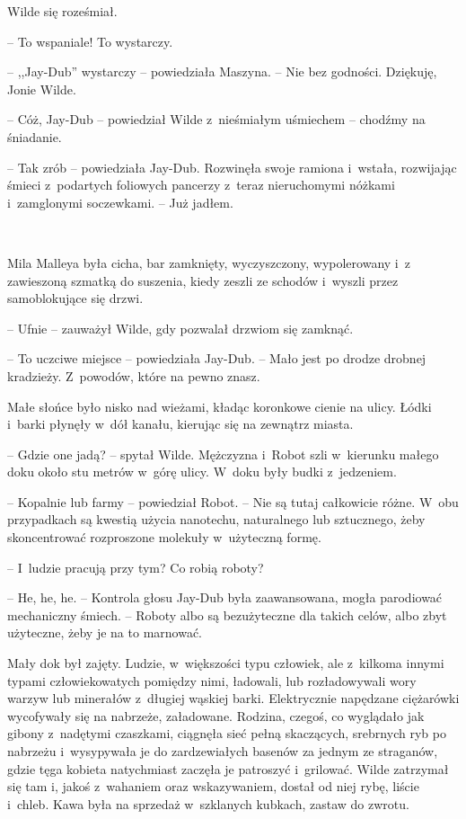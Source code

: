 \documentclass[oneside,polish,11pt,sfheadings]{mwbk}
\begin{document}
Wilde się roześmiał. 

-- To wspaniale! To wystarczy.

-- ,,Jay-Dub'' wystarczy -- powiedziała Maszyna. -- Nie bez godności.
Dziękuję, Jonie Wilde.

-- Cóż, Jay-Dub -- powiedział Wilde z~nieśmiałym uśmiechem -- chodźmy na
śniadanie.

-- Tak zrób -- powiedziała Jay-Dub. Rozwinęła swoje ramiona i~wstała,
rozwijając śmieci z~podartych foliowych pancerzy z~teraz nieruchomymi
nóżkami i~zamglonymi soczewkami. -- Już jadłem.

~

Mila Malleya była cicha, bar zamknięty, wyczyszczony, wypolerowany i~z zawieszoną szmatką do suszenia, kiedy zeszli ze schodów i~wyszli przez
samoblokujące się drzwi.

-- Ufnie -- zauważył Wilde, gdy pozwalał drzwiom się zamknąć.

-- To uczciwe miejsce -- powiedziała Jay-Dub. -- Mało jest po drodze
drobnej kradzieży. Z~powodów, które na pewno znasz.

Małe słońce było nisko nad wieżami, kładąc koronkowe cienie na ulicy.
Łódki i~barki płynęły w~dół kanału, kierując się na zewnątrz miasta.

-- Gdzie one jadą? -- spytał Wilde. Mężczyzna i~Robot szli w~kierunku
małego doku około stu metrów w~górę ulicy. W~doku były budki z~jedzeniem.

-- Kopalnie lub farmy -- powiedział Robot. -- Nie są tutaj całkowicie
różne. W~obu przypadkach są kwestią użycia nanotechu, naturalnego lub
sztucznego, żeby skoncentrować rozproszone molekuły w~użyteczną formę.

-- I~ludzie pracują przy tym? Co robią roboty?

-- He, he, he. -- Kontrola głosu Jay-Dub była zaawansowana, mogła
parodiować mechaniczny śmiech. -- Roboty albo są bezużyteczne dla takich
celów, albo zbyt użyteczne, żeby je na to marnować.

Mały dok był zajęty. Ludzie, w~większości typu człowiek, ale z~kilkoma
innymi typami człowiekowatych pomiędzy nimi, ładowali, lub rozładowywali
wory warzyw lub minerałów z~długiej wąskiej barki. Elektrycznie
napędzane ciężarówki wycofywały się na nabrzeże, załadowane. Rodzina,
czegoś, co wyglądało jak gibony z~nadętymi czaszkami, ciągnęła sieć
pełną skaczących, srebrnych ryb po nabrzeżu i~wysypywała je do
zardzewiałych basenów za jednym ze straganów, gdzie tęga kobieta
natychmiast zaczęła je patroszyć i~grilować. Wilde zatrzymał się tam i,
jakoś z~wahaniem oraz wskazywaniem, dostał od niej rybę, liście i~chleb.
Kawa była na sprzedaż w~szklanych kubkach, zastaw do zwrotu.
\end{document}
